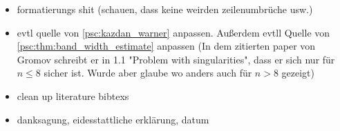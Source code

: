 \begin{itemize}
    \item formatierungs shit (schauen, dass keine weirden zeilenumbrüche usw.)
    \item evtl quelle von \ref{psc:kazdan_warner} anpassen. Außerdem evtll Quelle von \ref{psc:thm:band_width_estimate} anpassen (In dem zitierten paper von Gromov schreibt er in 1.1 "Problem with singularities", dass er sich nur für $n \leq 8$ sicher ist. Wurde aber glaube wo anders auch für $n > 8$ gezeigt)
    \item clean up literature bibtexs
    \item danksagung, eidesstattliche erklärung, datum
\end{itemize}